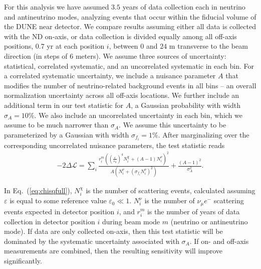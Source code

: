 For this analysis we have assumed $3.5$ years of data collection each in neutrino and antineutrino modes, analyzing events that occur within the fiducial volume of the DUNE near detector. We compare results assuming either all data is collected with the ND on-axis, or data collection is divided equally among all off-axis positions, $0.7$ yr at each position  $i$, between $0$ and $24$ m transverse to the beam direction (in steps of 6 meters).
We assume three sources of uncertainty: statistical, correlated systematic, and an uncorrelated systematic in each bin. 
For a correlated systematic uncertainty, we include a nuisance parameter $A$ that modifies the number of neutrino-related background events in all bins -- an overall normalization uncertainty across all off-axis locations. 
We further include an additional term in our test statistic for $A$, a  Gaussian probability with width $\sigma_A = 10\%$. 
We also include an uncorrelated uncertainty in each bin, which we assume to be much narrower than $\sigma_A$. 
We assume this uncertainty to be parameterized by a Gaussian with width $\sigma_{f_i} = 1\%$. 
After marginalizing over the corresponding uncorrelated nuisance parameters, the test statistic reads
\begin{eqnarray}\label{eq:chisqfull}
-2\Delta \mathcal{L} = \sum_i \frac{r_i^m\left( \left(\frac{\varepsilon}{\varepsilon_0}\right)^4 N_i^\chi + (A-1)N_i^\nu\right)^2}{A\left(N_i^\nu + (\sigma_{f_i} N_i^\nu)^2 \right)} + \frac{\left(A-1\right)^2}{\sigma_A^2}.
\end{eqnarray}


In Eq.~(\ref{eq:chisqfull}), $N_i^\chi$ is the number of  scattering events, calculated assuming $\varepsilon$ is equal to some reference value $\varepsilon_0 \ll 1$. $N_i^\nu$ is the number of $\nu_\mu e^-$ scattering events expected in detector position $i$, and $r_i^m$ is the number of years of data collection in detector position $i$ during beam mode $m$ (neutrino or antineutrino mode). If data are only collected on-axis, then this test statistic will be dominated by the systematic uncertainty associated with $\sigma_A$. If on- and off-axis measurements are combined, then the resulting sensitivity will improve significantly.

